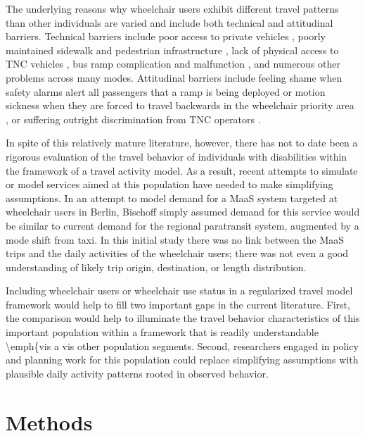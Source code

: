 \documentclass[3p, authoryear, review]{elsarticle} %
\begin{document}
The underlying reasons why wheelchair users exhibit different travel patterns
than other individuals are varied and include both technical and attitudinal
barriers. Technical barriers include poor access to private vehicles
\citet{VanRoosmalen2010}, poorly maintained sidewalk and pedestrian infrastructure
\citet{frackelton2013measuring}, lack of physical access to TNC
vehicles \citet{Ruvolo2020}, bus ramp complication and malfunction \citet{Velho2016},
and numerous other problems across many modes.
Attitudinal barriers include feeling shame when safety alarms alert all
passengers that a ramp is being deployed or motion sickness when they are forced
to travel backwards in the wheelchair priority area \citet{Velho2016}, or
suffering outright discrimination from TNC operators \citet{Bascom2017}.

In spite of this relatively mature literature, however, there has not to
date been a rigorous evaluation of the travel behavior of individuals with
disabilities within the framework of a travel activity model. As a result,
recent attempts to simulate or model services aimed at this population have
needed to make simplifying assumptions. In an attempt to model demand for a MaaS
system targeted at wheelchair users in
Berlin, Bischoff \citet{Bischoff2019} simply assumed demand for this service
would be similar to current demand for the regional paratransit system, augmented
by a mode shift from taxi. In this initial study there was no link between the
MaaS trips and the daily activities of the wheelchair users; there was not even a
good understanding of likely trip origin, destination, or length distribution.

Including wheelchair users or wheelchair use status in a regularized travel model
framework would help to fill two important gaps in the current literature. First,
the comparison would help to illuminate the travel behavior characteristics of
this important population within a framework that is readily understandable
\textbackslash emph\{vis a vis other population segments. Second, researchers engaged in
policy and planning work for this population could replace simplifying assumptions
with plausible daily activity patterns rooted in observed behavior.

\hypertarget{methods}{%
\section{Methods}\label{methods}}
\end{document}
